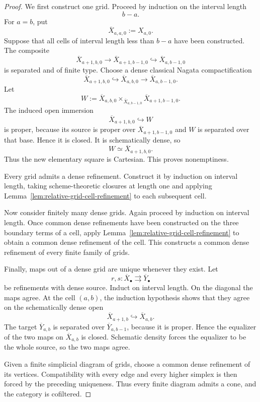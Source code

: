 \begin{proof}
We first construct one grid.  Proceed by induction on the interval length
\[
    b-a.
\]
For \(a=b\), put
\[
    \overline X_{a,a,0}
    :=
    X_{a,0}.
\]
Suppose that all cells of interval length less than \(b-a\) have been
constructed.  The composite
\[
    \overline X_{a+1,b,0}
    \longrightarrow
    \overline X_{a+1,b-1,0}
    \hookrightarrow
    \overline X_{a,b-1,0}
\]
is separated and of finite type.  Choose a dense classical Nagata
compactification
\[
    \overline X_{a+1,b,0}
    \hookrightarrow
    \overline X_{a,b,0}
    \longrightarrow
    \overline X_{a,b-1,0}.
\]
Let
\[
    W
    :=
    \overline X_{a,b,0}
    \times_{\overline X_{a,b-1,0}}
    \overline X_{a+1,b-1,0}.
\]
The induced open immersion
\[
    \overline X_{a+1,b,0}
    \hookrightarrow
    W
\]
is proper, because its source is proper over
\(\overline X_{a+1,b-1,0}\) and \(W\) is separated over that base.  Hence
it is closed.  It is schematically dense, so
\[
    W
    \simeq
    \overline X_{a+1,b,0}.
\]
Thus the new elementary square is Cartesian.  This proves nonemptiness.

Every grid admits a dense refinement.  Construct it by induction on interval
length, taking scheme-theoretic closures at length one and applying
Lemma~\ref{lem:relative-grid-cell-refinement} to each subsequent cell.

Now consider finitely many dense grids.  Again proceed by induction on
interval length.  Once common dense refinements have been constructed on the
three boundary terms of a cell, apply
Lemma~\ref{lem:relative-grid-cell-refinement} to obtain a common dense
refinement of the cell.  This constructs a common dense refinement of every
finite family of grids.

Finally, maps out of a dense grid are unique whenever they exist.  Let
\[
    r,s:
    \overline X_\bullet
    \rightrightarrows
    \overline Y_\bullet
\]
be refinements with dense source.  Induct on interval length.  On the
diagonal the maps agree.  At the cell \((a,b)\), the induction hypothesis
shows that they agree on the schematically dense open
\[
    \overline X_{a+1,b}
    \hookrightarrow
    \overline X_{a,b}.
\]
The target \(\overline Y_{a,b}\) is separated over
\(\overline Y_{a,b-1}\), because it is proper.  Hence the equalizer of the
two maps on \(\overline X_{a,b}\) is closed.  Schematic density forces the
equalizer to be the whole source, so the two maps agree.

Given a finite simplicial diagram of grids, choose a common dense refinement
of its vertices.  Compatibility with every edge and every higher simplex is
then forced by the preceding uniqueness.  Thus every finite diagram admits
a cone, and the category is cofiltered.
\end{proof}

